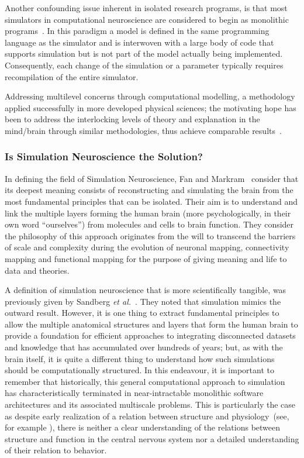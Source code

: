 \documentclass[10pt,letterpaper]{article}
\begin{document}
Another confounding issue inherent in isolated research programs, is that most simulators in computational neuroscience are considered to begin as monolithic programs~\cite{cannon07:_inter}. In this paradigm a model is defined in the same programming language as the simulator and is interwoven with a large body of code that supports simulation but is not part of the model actually being implemented. Consequently, each change of the simulation or a parameter typically requires recompilation of the entire simulator.

Addressing multilevel concerns through computational modelling, a methodology applied successfully in more developed physical sciences; the motivating hope has been to address the interlocking levels of theory and explanation in the mind/brain through similar methodologies, thus achieve comparable results~\cite{bickle19}.

\subsubsection*{Is Simulation Neuroscience the Solution?}
\label{subsection:simneuro}

In defining the field of Simulation Neuroscience, Fan and Markram~\cite{fan19} consider that its deepest meaning consists of reconstructing and simulating the brain from the most fundamental principles that can be isolated. Their aim is to understand and link the multiple layers forming the human brain (more psychologically, in their own word ``ourselves'') from molecules and cells to brain function. They consider the philosophy of this approach originates from the will to transcend the barriers of scale and complexity during the evolution of neuronal mapping, connectivity mapping and functional mapping for the purpose of giving meaning and life to data and theories.

A definition of simulation neuroscience that is more scientifically tangible, was previously given by Sandberg {\it{et al}.}~\cite{sandberg08}. They noted that simulation mimics the outward result. However, it is one thing to extract fundamental principles to allow the multiple anatomical structures and layers that form the human brain to provide a foundation for efficient approaches to integrating disconnected datasets and knowledge that has accumulated over hundreds of years; but, as with the brain itself, it is quite a different thing to understand how such simulations should be computationally structured. In this endeavour, it is important to remember that historically, this general computational approach to simulation has characteristically terminated in near-intractable monolithic software architectures and its associated multiscale problems.
This is particularly the case as despite early realization of a relation between structure and physiology~(see, for example \cite{sieck17}), there is neither a clear understanding of the relations between structure and function in the central nervous system nor a detailed understanding of their relation to behavior.
\end{document}
